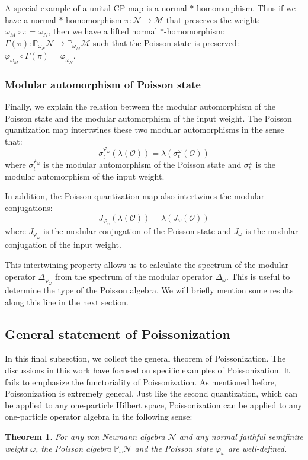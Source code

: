 \documentclass[a4paper,11pt]{article}
\newtheorem{theorem}{Theorem}
\theoremstyle{definition}
\numberwithin{equation}{section}
\begin{document}
A special example of a unital CP map is a normal $*$-homomorphism. Thus if we have a normal $*$-homomorphism $\pi:\mathcal{N}\rightarrow\mathcal{M}$ that preserves the weight: $\omega_M\circ\pi = \omega_N$, then we have a lifted normal $*$-homomorphism: $\Gamma(\pi):\mathbb{P}_{\omega_N}\mathcal{N}\rightarrow\mathbb{P}_{\omega_M}\mathcal{M}$ such that the Poisson state is preserved: $\varphi_{\omega_M}\circ\Gamma(\pi) = \varphi_{\omega_N}$.

\subsubsection{Modular automorphism of Poisson state}

Finally, we explain the relation between the modular automorphism of the Poisson state and the modular automorphism of the input weight. The Poisson quantization map intertwines these two modular automorphisms in the sense that:
\begin{equation}
    \sigma_t^{\varphi_\omega}(\lambda(\mathcal{O})) = \lambda(\sigma_t^\omega(\mathcal{O}))
\end{equation}
where $\sigma_t^{\varphi_\omega}$ is the modular automorphism of the Poisson state and $\sigma_t^\omega$ is the modular automorphism of the input weight.

In addition, the Poisson quantization map also intertwines the modular conjugations:
\begin{equation}
    J_{\varphi_\omega}(\lambda(\mathcal{O})) = \lambda(J_\omega(\mathcal{O}))
\end{equation}
where $J_{\varphi_\omega}$ is the modular conjugation of the Poisson state and $J_\omega$ is the modular conjugation of the input weight.

This intertwining property allows us to calculate the spectrum of the modular operator $\Delta_{\varphi_\omega}$ from the spectrum of the modular operator $\Delta_\omega$. This is useful to determine the type of the Poisson algebra. We will briefly mention some results along this line in the next section. 

\subsection{General statement of Poissonization}

In this final subsection, we collect the general theorem of Poissonization. The discussions in this work have focused on specific examples of Poissonization. It fails to emphasize the functoriality of Poissonization. As mentioned before, Poissonization is extremely general. Just like the second quantization, which can be applied to any one-particle Hilbert space, Poissonization can be applied to any one-particle operator algebra in the following sense:
\begin{theorem}
    For any von Neumann algebra $\mathcal{N}$ and any normal faithful semifinite weight $\omega$, the Poisson algebra $\mathbb{P}_\omega\mathcal{N}$ and the Poisson state $\varphi_\omega$ are well-defined.
\end{theorem}
\end{document}
